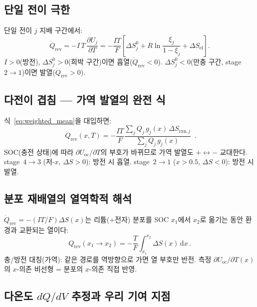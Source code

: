 \documentclass[11pt,a4paper]{article}
\newcommand{\dd}{\mathrm{d}}
\newcommand{\rxn}{\mathrm{rxn}}
\newcommand{\rev}{\mathrm{rev}}
\newcommand{\oc}{\mathrm{oc}}
\newcommand{\el}{\mathrm{el}}
\begin{document}
\subsection{단일 전이 극한}\label{ssec:qrev_single}

단일 전이 $j$ 지배 구간에서:
\begin{equation}
  \dot{Q}_{\rev}=-I\,T\,\frac{\partial U_j}{\partial T}
    =-\frac{IT}{F}\left[\Delta S^0_j+R\ln\frac{\xi_j}{1-\xi_j}+\Delta S_\el\right].
  \label{eq:qrev_single}
\end{equation}
$I>0$(방전), $\Delta S^0_j>0$(희박 구간)이면 흡열($\dot{Q}_{\rev}<0$).
$\Delta S^0_j<0$(만충 구간, stage~$2\to1$)이면 발열($\dot{Q}_{\rev}>0$).

\subsection{다전이 겹침 --- 가역 발열의 완전 식}\label{ssec:qrev_multi}

식~\eqref{eq:weighted_mean}을 대입하면:
\begin{equation}
  \boxed{\;\dot{Q}_{\rev}(x,T)=-\frac{IT}{F}
    \frac{\sum_j Q_j\,g_j(x)\,\Delta S_{\rxn,j}}{\sum_j Q_j\,g_j(x)}\;}\,.
  \label{eq:qrev_final}
\end{equation}
SOC(충전 상태)에 따라 $\partial U_{\oc}/\partial T$의 부호가 바뀌므로
가역 발열도 $+\leftrightarrow-$ 교대한다.
stage~$4\to3$ (저-$x$, $\Delta S>0$): 방전 시 흡열.
stage~$2\to1$ ($x>0.5$, $\Delta S<0$): 방전 시 발열.

\subsection{분포 재배열의 열역학적 해석}\label{ssec:rearrangement}

$\dot{Q}_{\rev}=-(IT/F)\Delta S(x)$는 리튬(+전자) 분포를 SOC $x_1$에서 $x_2$로 옮기는 동안
환경과 교환되는 열이다:
\begin{equation}
  Q_{\rev}(x_1\to x_2)=-\frac{T}{F}\int_{x_1}^{x_2}\Delta S(x)\,\dd x\,.
  \label{eq:Qrev_integral}
\end{equation}
충/방전 대칭(가역): 같은 경로를 역방향으로 가면 열 부호만 반전.
측정 $\partial U_{\oc}/\partial T(x)$의 $x$-의존 비선형 = 분포의 $x$-의존 직접 반영.

\subsection{다온도 $dQ/dV$ 추정과 우리 기여 지점}\label{ssec:contribution}
\end{document}
